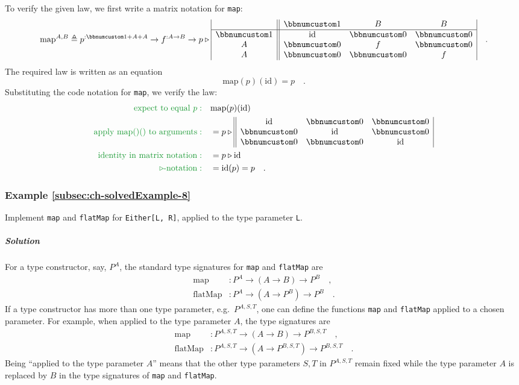 To verify the given law, we first write a matrix notation for \lstinline!map!:
\[
\text{map}^{A,B}\triangleq p^{:\bbnum 1+A+A}\rightarrow f^{:A\rightarrow B}\rightarrow p\triangleright\begin{array}{|c||ccc|}
 & \bbnum 1 & B & B\\
\hline \bbnum 1 & \text{id} & \bbnum 0 & \bbnum 0\\
A & \bbnum 0 & f & \bbnum 0\\
A & \bbnum 0 & \bbnum 0 & f
\end{array}\quad.
\]
The required law is written as an equation
\[
\text{map}(p)(\text{id})=p\quad.
\]
Substituting the code notation for \lstinline!map!, we verify the
law:
\begin{align*}
{\color{greenunder}\text{expect to equal }p:}\quad & \text{map}(p)(\text{id})\\
{\color{greenunder}\text{apply map()() to arguments}:}\quad & =p\triangleright\begin{array}{||ccc|}
\text{id} & \bbnum 0 & \bbnum 0\\
\bbnum 0 & \text{id} & \bbnum 0\\
\bbnum 0 & \bbnum 0 & \text{id}
\end{array}\\
{\color{greenunder}\text{identity in matrix notation}:}\quad & =p\triangleright\text{id}\\
{\color{greenunder}\triangleright\text{-notation}:}\quad & =\text{id}(p)=p\quad.
\end{align*}


\subsubsection{Example \label{subsec:ch-solvedExample-8}\ref{subsec:ch-solvedExample-8}}

Implement \lstinline!map! and \lstinline!flatMap! for \lstinline!Either[L, R]!,
applied to the type parameter \lstinline!L!.

\subparagraph{Solution}

For a type constructor, say, $P^{A}$, the standard type signatures
for \lstinline!map! and \lstinline!flatMap! are
\begin{align*}
\text{map} & :P^{A}\rightarrow(A\rightarrow B)\rightarrow P^{B}\quad,\\
\text{flatMap} & :P^{A}\rightarrow(A\rightarrow P^{B})\rightarrow P^{B}\quad.
\end{align*}
If a type constructor has more than one type parameter, e.g.~$P^{A,S,T}$,
one can define the functions \lstinline!map! and \lstinline!flatMap!
applied to a chosen parameter. For example, when applied to the type
parameter $A$, the type signatures are 
\begin{align*}
\text{map} & :P^{A,S,T}\rightarrow(A\rightarrow B)\rightarrow P^{B,S,T}\quad,\\
\text{flatMap} & :P^{A,S,T}\rightarrow(A\rightarrow P^{B,S,T})\rightarrow P^{B,S,T}\quad.
\end{align*}
Being ``applied to the type parameter $A$'' means that the other
type parameters $S,T$ in $P^{A,S,T}$ remain fixed while the type
parameter $A$ is replaced by $B$ in the type signatures of \lstinline!map!
and \lstinline!flatMap!.

